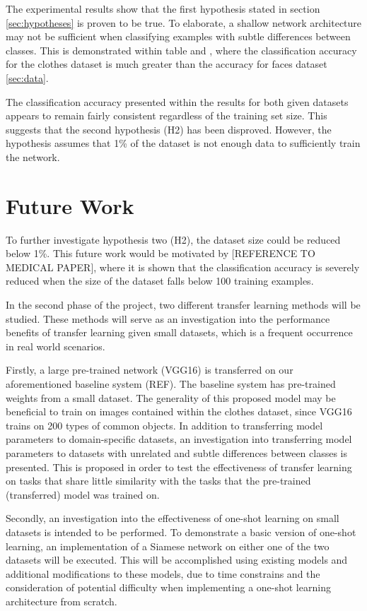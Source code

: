 \documentclass{article}
\begin{document}
The experimental results show that the first hypothesis stated in section \ref{sec:hypotheses} is proven to be true. To elaborate, a shallow network architecture may not be sufficient when classifying examples with subtle differences between classes. This is demonstrated within table \label{tab:2} and \label{tab:3}, where the classification accuracy for the clothes dataset is much greater than the accuracy for faces dataset \ref{sec:data}.

The classification accuracy presented within the results for both given datasets appears to remain fairly consistent regardless of the training set size. This suggests that the second hypothesis (H2) has been disproved. However, the hypothesis assumes that 1\% of the dataset is not enough data to sufficiently train the network.

\section{Future Work}
\label{sec:future}

To further investigate hypothesis two (H2), the dataset size could be reduced below 1\%. This future work would be motivated by [REFERENCE TO MEDICAL PAPER], where it is shown that the classification accuracy is severely reduced when the size of the dataset falls below 100 training examples.

In the second phase of the project, two different transfer learning methods will be studied. These methods will serve as an investigation into the performance benefits of transfer learning given small datasets, which is a frequent occurrence in real world scenarios.

Firstly, a large pre-trained network (VGG16) \cite{DBLP:journals/corr/SimonyanZ14a} is transferred on our aforementioned baseline system (REF). The baseline system has pre-trained weights from a small dataset. The generality of this proposed model may be beneficial to train on images contained within the clothes dataset, since VGG16 trains on 200 types of common objects. In addition to transferring model parameters to domain-specific datasets, an investigation into transferring model parameters to datasets with unrelated and subtle differences between classes is presented. This is proposed in order to test the effectiveness of transfer learning on tasks that share little similarity with the tasks that the pre-trained (transferred) model was trained on.

Secondly, an investigation into the effectiveness of one-shot learning on small datasets is intended to be performed. To demonstrate a basic version of one-shot learning, an implementation of a Siamese network \cite{bromley1994signature} on either one of the two datasets will be executed. This will be accomplished using existing models and additional modifications to these models, due to time constrains and the consideration of potential difficulty when implementing a one-shot learning architecture from scratch.
\end{document}
